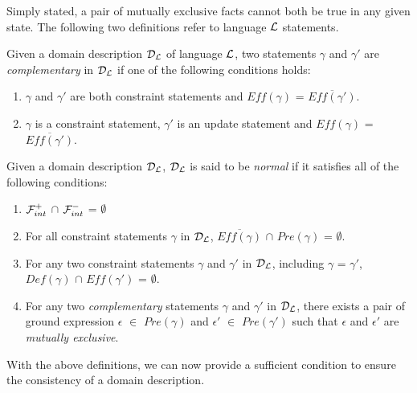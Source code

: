 \documentclass[global,twocolumn,final]{svjour}
\newenvironment{vdefinition}
  {\begin{definition}\hspace{0.25em}}
  {\end{definition}}
\begin{document}
    Simply stated, a pair of mutually exclusive facts cannot both be true
    in any given state. The following two definitions refer to language
    ${\cal L}$ statements.

    \begin{vdefinition}
      \label{def-comp}
      Given a domain description ${\cal D_{L}}$ of language ${\cal L}$,
      two statements $\gamma$ and $\gamma'$ are {\em complementary} in
      ${\cal D_{L}}$ if one of the following conditions holds:
      \begin{enumerate}
        \item
          $\gamma$ and $\gamma'$ are both constraint statements and
          $Eff(\gamma)$ = $\overline{Eff(\gamma')}$.
        \item
          $\gamma$ is a constraint statement, $\gamma'$ is an update
          statement and $Eff(\gamma)$ = $\overline{Eff(\gamma')}$.
      \end{enumerate}
    \end{vdefinition}

    \begin{vdefinition}
      \label{def-norm}
      Given a domain description ${\cal D_{L}}$, ${\cal D_{L}}$ is said to
      be {\em normal} if it satisfies all of the following conditions:
      \begin{enumerate}
        \item
          \label{def-norm-1}
          ${\cal F}^{+}_{int}$ $\cap$ ${\cal F}^{-}_{int}$ = $\emptyset$
        \item
          \label{def-norm-2}
          For all constraint statements $\gamma$ in ${\cal D_{L}}$,
          $\overline{Eff(\gamma)}$ $\cap$ $Pre(\gamma)$ = $\emptyset$.
        \item
          \label{def-norm-3}
          For any two constraint statements $\gamma$ and $\gamma'$ in
          ${\cal D_{L}}$, including $\gamma$ = $\gamma'$, $Def(\gamma)$ $\cap$
          $Eff(\gamma')$ = $\emptyset$.
        \item
          \label{def-norm-4}
          For any two {\em complementary} statements $\gamma$ and $\gamma'$ in
          ${\cal D_{L}}$, there exists a pair of ground expression $\epsilon$
          $\in$ $Pre(\gamma)$ and $\epsilon'$ $\in$ $Pre(\gamma')$ such that
          $\epsilon$ and $\epsilon'$ are {\em mutually exclusive}.
      \end{enumerate}
    \end{vdefinition}

    With the above definitions, we can now provide a sufficient condition to
    ensure the consistency of a domain description.
\end{document}
